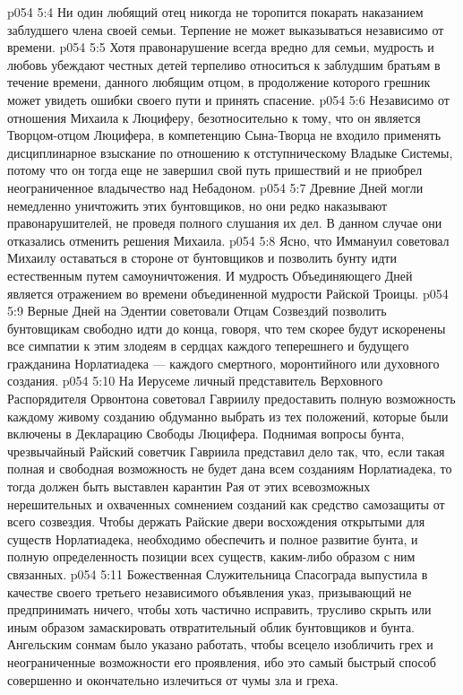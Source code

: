 \vs p054 5:4 \bibnobreakspace Ни один любящий отец никогда не торопится покарать наказанием заблудшего члена своей семьи. Терпение не может выказываться независимо от времени.
\vs p054 5:5 \bibnobreakspace Хотя правонарушение всегда вредно для семьи, мудрость и любовь убеждают честных детей терпеливо относиться к заблудшим братьям в течение времени, данного любящим отцом, в продолжение которого грешник может увидеть ошибки своего пути и принять спасение.
\vs p054 5:6 \bibnobreakspace Независимо от отношения Михаила к Люциферу, безотносительно к тому, что он является Творцом\hyp{}отцом Люцифера, в компетенцию Сына\hyp{}Творца не входило применять дисциплинарное взыскание по отношению к отступническому Владыке Системы, потому что он тогда еще не завершил свой путь пришествий и не приобрел неограниченное владычество над Небадоном.
\vs p054 5:7 \bibnobreakspace Древние Дней могли немедленно уничтожить этих бунтовщиков, но они редко наказывают правонарушителей, не проведя полного слушания их дел. В данном случае они отказались отменить решения Михаила.
\vs p054 5:8 \bibnobreakspace Ясно, что Иммануил советовал Михаилу оставаться в стороне от бунтовщиков и позволить бунту идти естественным путем самоуничтожения. И мудрость Объединяющего Дней является отражением во времени объединенной мудрости Райской Троицы.
\vs p054 5:9 \bibnobreakspace Верные Дней на Эдентии советовали Отцам Созвездий позволить бунтовщикам свободно идти до конца, говоря, что тем скорее будут искоренены все симпатии к этим злодеям в сердцах каждого теперешнего и будущего гражданина Норлатиадека --- каждого смертного, моронтийного или духовного создания.
\vs p054 5:10 \bibnobreakspace На Иерусеме личный представитель Верховного Распорядителя Орвонтона советовал Гавриилу предоставить полную возможность каждому живому созданию обдуманно выбрать из тех положений, которые были включены в Декларацию Свободы Люцифера. Поднимая вопросы бунта, чрезвычайный Райский советчик Гавриила представил дело так, что, если такая полная и свободная возможность не будет дана всем созданиям Норлатиадека, то тогда должен быть выставлен карантин Рая от этих всевозможных нерешительных и охваченных сомнением созданий как средство самозащиты от всего созвездия. Чтобы держать Райские двери восхождения открытыми для существ Норлатиадека, необходимо обеспечить и полное развитие бунта, и полную определенность позиции всех существ, каким\hyp{}либо образом с ним связанных.
\vs p054 5:11 \bibnobreakspace Божественная Служительница Спасограда выпустила в качестве своего третьего независимого объявления указ, призывающий не предпринимать ничего, чтобы хоть частично исправить, трусливо скрыть или иным образом замаскировать отвратительный облик бунтовщиков и бунта. Ангельским сонмам было указано работать, чтобы всецело изобличить грех и неограниченные возможности его проявления, ибо это самый быстрый способ совершенно и окончательно излечиться от чумы зла и греха.
